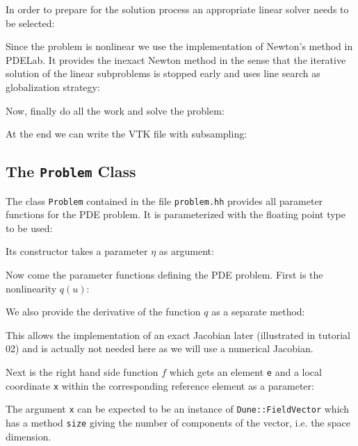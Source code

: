 \documentclass[a4paper,12pt]{article}
\begin{document}
In order to prepare for the solution process an appropriate 
linear solver needs to be selected:


Since the problem is nonlinear we use the implementation of
Newton's method in PDELab. It provides the inexact Newton method
in the sense that the iterative solution of the linear subproblems is
stopped early and uses line search as globalization strategy:


Now, finally do all the work and solve the problem:


At the end we can write the VTK file with subsampling:


\subsection{The \lstinline{Problem} Class}

The class \lstinline{Problem} contained in the file \lstinline{problem.hh}
provides all parameter functions for the PDE problem. It is parameterized
with the floating point type to be used:

Its constructor takes a parameter $\eta$ as argument:

Now come the parameter functions defining the PDE problem.
First is the nonlinearity $q(u)$:

We also provide the derivative of the function $q$ as a separate method:

This allows the implementation of an exact Jacobian later (illustrated
in tutorial 02) and is actually not needed here as we will use a
numerical Jacobian.

Next is the right hand side function $f$ which gets 
an element \lstinline{e} and a local coordinate \lstinline{x} within
the corresponding reference element as a parameter:

The argument \lstinline{x} can be expected to be an instance
of \lstinline{Dune::FieldVector} which has a method \lstinline{size}
giving the number of components of the vector, i.e. the space dimension.
\end{document}

